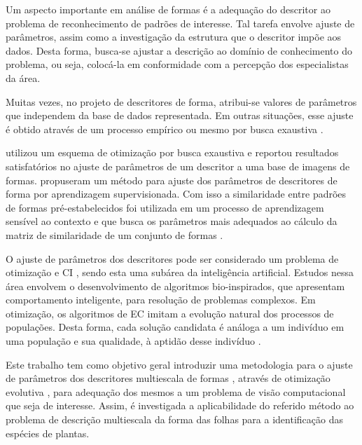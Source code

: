 
Um aspecto importante em análise de formas é a adequação do descritor ao problema de reconhecimento de padrões de interesse. Tal tarefa envolve ajuste de parâmetros, assim como a investigação da estrutura que o descritor impõe aos dados. Desta forma, busca-se ajustar a descrição ao domínio de conhecimento do problema, ou seja, colocá-la em conformidade com a percepção dos especialistas da área. 

Muitas vezes, no projeto de descritores de forma, atribui-se valores de parâmetros que independem da base de dados representada. Em outras situações, esse ajuste é obtido através de um processo empírico ou mesmo por busca exaustiva \cite{mokhtarian1998robust, Ling:2007:SCU:1191552.1191806, Wang2012134}.

  utilizou um esquema de otimização por busca exaustiva e reportou resultados satisfatórios no ajuste de parâmetros de um descritor a uma base de imagens de formas.   propuseram um método para ajuste dos parâmetros de descritores de forma por aprendizagem supervisionada. Com isso a similaridade entre padrões de formas pré-estabelecidos foi utilizada em um processo de aprendizagem sensível ao contexto e que busca os parâmetros mais adequados ao cálculo da matriz de similaridade de um conjunto de formas \cite{4815272}.

O ajuste de parâmetros dos descritores pode ser considerado um problema de otimização e \ac{CI} \cite{Andries:2007}, sendo esta uma subárea da inteligência artificial. Estudos nessa área envolvem o desenvolvimento de algoritmos bio-inspirados, que apresentam comportamento inteligente, para resolução de problemas complexos. Em otimização, os algoritmos de \ac{EC} imitam a evolução natural dos processos de populações. Desta forma, cada solução candidata é análoga a um indivíduo em uma população e sua qualidade, à aptidão desse indivíduo \cite{Eiben:2015}.

Este trabalho tem como objetivo geral introduzir uma metodologia para o ajuste de parâmetros dos descritores multiescala de formas \cite{Costa:2009}, através de otimização evolutiva \cite{Andries:2007}, para adequação dos mesmos a um problema de visão computacional que seja de interesse. Assim, é investigada a aplicabilidade do referido método ao problema de descrição multiescala da forma das folhas para a identificação das espécies de plantas. 

